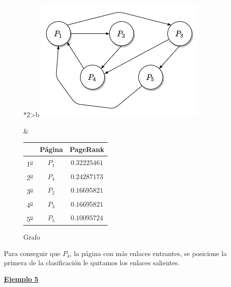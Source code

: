 \documentclass[size=a4, parskip=half, titlepage=false, toc=flat, toc=bib, 12pt]{scrartcl}
\theoremstyle{theorem-style}
\theoremstyle{definition-style}
\theoremstyle{remark-style}
\theoremstyle{example-style}
\theoremstyle{definition-style}
\theoremstyle{remark-style}
\begin{document}
\begin{figure}[!ht]
  \begin{tabular}{*{2}{>{\centering\arraybackslash}b{}}}
  \centering
    \includegraphics[scale=0.5]{./img/grafoej4}
    \caption{Grafo}
    &
      \renewcommand{\arraystretch}{1.3}
      \begin{tabular}{ccc}
        & Página & PageRank     \\ \hline
      1\textsuperscript{\underline{o}}} & $P_1$  & $0.32225461$ \\ \hline
      2\textsuperscript{\underline{o}}} & $P_4$  & $0.24287173$ \\ \hline
      3\textsuperscript{\underline{o}}} & $P_2$  & $0.16695821$ \\ \hline
      4\textsuperscript{\underline{o}}} & $P_3$  & $0.16695821$ \\ \hline
      5\textsuperscript{\underline{o}}} & $P_5$  & $0.10095724$ \\ \hline
      \end{tabular}
    \end{tabular}
\end{figure}

\newpage

Para conseguir que $P_4$, la página con más enlaces entrantes, se posicione la primera de la clasificación le quitamos los enlaces salientes.

\underline{\textbf{Ejemplo 5}}
\end{document}
